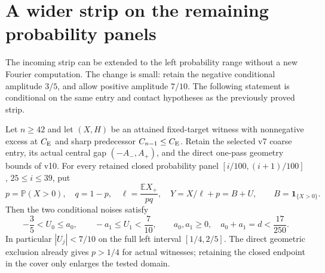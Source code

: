 \section{A wider strip on the remaining probability panels}

The incoming strip can be extended to the left probability range without
a new Fourier computation. The change is small: retain the negative
conditional amplitude $3/5$, and allow positive amplitude $7/10$.
The following statement is conditional on the same entry and contact
hypotheses as the previously proved strip.

\begin{proposition}\label{left:strip}
Let $n\ge42$ and let $(X,H)$ be an attained fixed-target witness with
nonnegative excess at $C_{\rm E}$ and sharp predecessor
$C_{n-1}\le C_{\rm E}$. Retain the selected v7 coarse entry, its actual
central gap $(-A_-,A_+)$, and the direct one-pass geometry bounds of v10.
For every retained closed probability panel
$[i/100,(i+1)/100]$, $25\le i\le39$, put
\[
 p=\mathbb P(X>0),\quad q=1-p,\quad
 \ell=\frac{\mathbb E X_+}{pq},\quad
 Y=X/\ell+p=B+U,\qquad B=\mathbf1_{\{X>0\}}.
\]
Then the two conditional noises satisfy
\[
 -\frac35<U_0\le a_0,\qquad
 -a_1\le U_1<\frac7{10},\qquad
 a_0,a_1\ge0,\quad a_0+a_1=d<\frac{17}{250}.
\]
In particular $|U_j|<7/10$ on the full left interval $[1/4,2/5]$.
The direct geometric exclusion already gives $p>1/4$ for actual witnesses;
retaining the closed endpoint in the cover only enlarges the tested domain.
\end{proposition}

